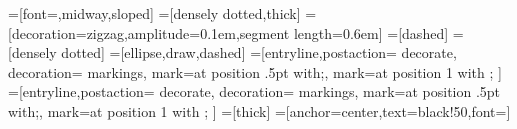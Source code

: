 \newcommand*{\actver}{\smash{\ensuremath{v_{\text{\textit{active}}}}}}

=[font=\scriptsize,midway,sloped]
=[densely dotted,thick] 
=[decoration={zigzag,amplitude=0.1em,segment length=0.6em}]
=[dashed]
=[densely dotted]
=[ellipse,draw,dashed]
=[entryline,postaction={%
  decorate,%
  decoration={%
    markings,%
    mark=at position .5pt with{\arrowreversed[line width=.35pt]{|}};,
    mark=at position 1 with{%
      };%
  }%
}]
=[entryline,postaction={%
  decorate,%
  decoration={%
    markings,%
    mark=at position .5pt with{\arrowreversed[line width=.35pt]{|}};,
    mark=at position 1 with{%
      };%
  }%
}]
=[thick]
=[anchor=center,text=black!50,font=\huge]
\newlength{\spexx}
\setlength{\spexx}{1.2cm}
\newlength{\spexy}
\setlength{\spexy}{.5cm}

